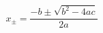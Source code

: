 \documentclass[12pt]{article}
\begin{document}
\thispagestyle{empty}
$$
x_{\pm} = \frac{-b \pm \sqrt{b^2 - 4ac} }{2a}
$$
\end{document}
